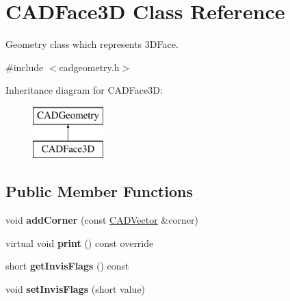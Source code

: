 \hypertarget{class_c_a_d_face3_d}{}\section{C\+A\+D\+Face3D Class Reference}
\label{class_c_a_d_face3_d}


Geometry class which represents 3\+D\+Face.  




{\ttfamily \#include $<$cadgeometry.\+h$>$}

Inheritance diagram for C\+A\+D\+Face3D\+:\begin{figure}[H]
\begin{center}
\leavevmode
\includegraphics[height=2.000000cm]{class_c_a_d_face3_d}
\end{center}
\end{figure}
\subsection*{Public Member Functions}
\begin{DoxyCompactItemize}
\item 
void {\bfseries add\+Corner} (const \hyperlink{class_c_a_d_vector}{C\+A\+D\+Vector} \&corner)\hypertarget{class_c_a_d_face3_d_aa173b3c57c8e5d223185f50a30b24d5c}{}\label{class_c_a_d_face3_d_aa173b3c57c8e5d223185f50a30b24d5c}

\item 
virtual void {\bfseries print} () const  override\hypertarget{class_c_a_d_face3_d_ae7d28d2b9934dd233f262ed7498a56de}{}\label{class_c_a_d_face3_d_ae7d28d2b9934dd233f262ed7498a56de}

\item 
short {\bfseries get\+Invis\+Flags} () const \hypertarget{class_c_a_d_face3_d_a9d9bac1cf36a63993e185de8efbe034c}{}\label{class_c_a_d_face3_d_a9d9bac1cf36a63993e185de8efbe034c}

\item 
void {\bfseries set\+Invis\+Flags} (short value)\hypertarget{class_c_a_d_face3_d_a8dd54f639fc34e38cfba6c8688905523}{}\label{class_c_a_d_face3_d_a8dd54f639fc34e38cfba6c8688905523}

\end{DoxyCompactItemize}
